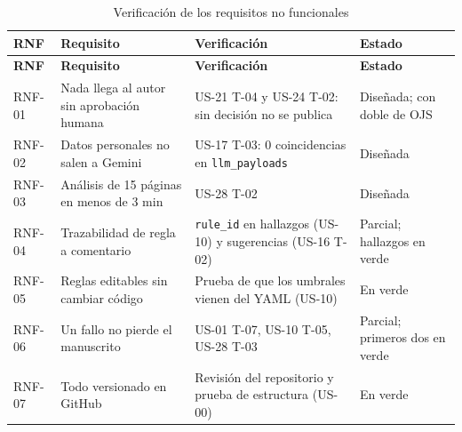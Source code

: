 {\small
\begin{longtable}{@{}>{\raggedright\arraybackslash}p{}>{\raggedright\arraybackslash}p{}>{\raggedright\arraybackslash}p{}>{\raggedright\arraybackslash}p{}@{}}
\caption{Verificación de los requisitos no funcionales}\label{tab:3-13}\\
\toprule
\textbf{RNF} & \textbf{Requisito} & \textbf{Verificación} & \textbf{Estado} \\
\midrule
\endfirsthead
\toprule
\textbf{RNF} & \textbf{Requisito} & \textbf{Verificación} & \textbf{Estado} \\
\midrule
\endhead
\bottomrule
\endfoot
\endlastfoot
RNF-01 & Nada llega al autor sin aprobación humana & US-21 T-04 y US-24 T-02: sin decisión no se publica & Diseñada; con doble de OJS \\
RNF-02 & Datos personales no salen a Gemini & US-17 T-03: 0 coincidencias en \texttt{llm\_\allowbreak{}payloads} & Diseñada \\
RNF-03 & Análisis de 15 páginas en menos de 3 min & US-28 T-02 & Diseñada \\
RNF-04 & Trazabilidad de regla a comentario & \texttt{rule\_\allowbreak{}id} en hallazgos (US-10) y sugerencias (US-16 T-02) & Parcial; hallazgos en verde \\
RNF-05 & Reglas editables sin cambiar código & Prueba de que los umbrales vienen del YAML (US-10) & En verde \\
RNF-06 & Un fallo no pierde el manuscrito & US-01 T-07, US-10 T-05, US-28 T-03 & Parcial; primeros dos en verde \\
RNF-07 & Todo versionado en GitHub & Revisión del repositorio y prueba de estructura (US-00) & En verde \\
\end{longtable}
}

